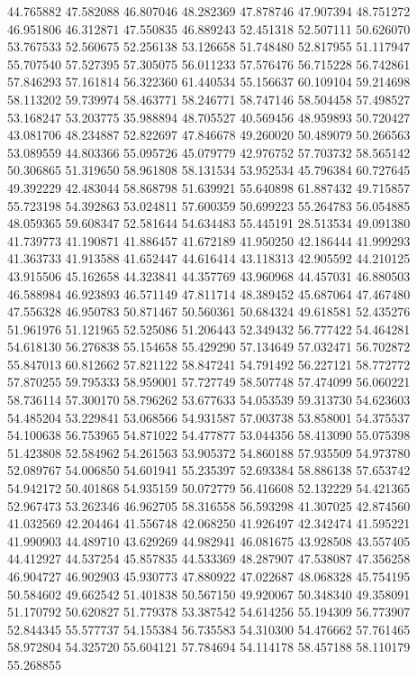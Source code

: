 44.765882
47.582088
46.807046
48.282369
47.878746
47.907394
48.751272
46.951806
46.312871
47.550835
46.889243
52.451318
52.507111
50.626070
53.767533
52.560675
52.256138
53.126658
51.748480
52.817955
51.117947
55.707540
57.527395
57.305075
56.011233
57.576476
56.715228
56.742861
57.846293
57.161814
56.322360
61.440534
55.156637
60.109104
59.214698
58.113202
59.739974
58.463771
58.246771
58.747146
58.504458
57.498527
53.168247
53.203775
35.988894
48.705527
40.569456
48.959893
50.720427
43.081706
48.234887
52.822697
47.846678
49.260020
50.489079
50.266563
53.089559
44.803366
55.095726
45.079779
42.976752
57.703732
58.565142
50.306865
51.319650
58.961808
58.131534
53.952534
45.796384
60.727645
49.392229
42.483044
58.868798
51.639921
55.640898
61.887432
49.715857
55.723198
54.392863
53.024811
57.600359
50.699223
55.264783
56.054885
48.059365
59.608347
52.581644
54.634483
55.445191
28.513534
49.091380
41.739773
41.190871
41.886457
41.672189
41.950250
42.186444
41.999293
41.363733
41.913588
41.652447
44.616414
43.118313
42.905592
44.210125
43.915506
45.162658
44.323841
44.357769
43.960968
44.457031
46.880503
46.588984
46.923893
46.571149
47.811714
48.389452
45.687064
47.467480
47.556328
46.950783
50.871467
50.560361
50.684324
49.618581
52.435276
51.961976
51.121965
52.525086
51.206443
52.349432
56.777422
54.464281
54.618130
56.276838
55.154658
55.429290
57.134649
57.032471
56.702872
55.847013
60.812662
57.821122
58.847241
54.791492
56.227121
58.772772
57.870255
59.795333
58.959001
57.727749
58.507748
57.474099
56.060221
58.736114
57.300170
58.796262
53.677633
54.053539
59.313730
54.623603
54.485204
53.229841
53.068566
54.931587
57.003738
53.858001
54.375537
54.100638
56.753965
54.871022
54.477877
53.044356
58.413090
55.075398
51.423808
52.584962
54.261563
53.905372
54.860188
57.935509
54.973780
52.089767
54.006850
54.601941
55.235397
52.693384
58.886138
57.653742
54.942172
50.401868
54.935159
50.072779
56.416608
52.132229
54.421365
52.967473
53.262346
46.962705
58.316558
56.593298
41.307025
42.874560
41.032569
42.204464
41.556748
42.068250
41.926497
42.342474
41.595221
41.990903
44.489710
43.629269
44.982941
46.081675
43.928508
43.557405
44.412927
44.537254
45.857835
44.533369
48.287907
47.538087
47.356258
46.904727
46.902903
45.930773
47.880922
47.022687
48.068328
45.754195
50.584602
49.662542
51.401838
50.567150
49.920067
50.348340
49.358091
51.170792
50.620827
51.779378
53.387542
54.614256
55.194309
56.773907
52.844345
55.577737
54.155384
56.735583
54.310300
54.476662
57.761465
58.972804
54.325720
55.604121
57.784694
54.114178
58.457188
58.110179
55.268855

